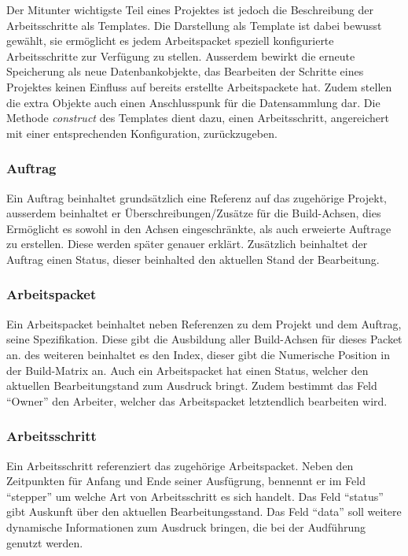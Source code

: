 Der Mitunter wichtigste Teil eines Projektes ist jedoch die Beschreibung der Arbeitsschritte als Templates.
Die Darstellung als Template ist dabei bewusst gew\"ahlt,
sie erm\"oglicht es jedem Arbeitspacket speziell konfigurierte Arbeitsschritte zur Verf\"ugung zu stellen.
Ausserdem bewirkt die erneute Speicherung als neue Datenbankobjekte,
das Bearbeiten der Schritte eines Projektes keinen Einfluss auf bereits erstellte Arbeitspackete hat.
Zudem stellen die extra Objekte auch einen Anschlusspunk f\"ur die Datensammlung dar.
Die Methode \textit{construct} des Templates dient dazu,
einen Arbeitsschritt, angereichert mit einer entsprechenden Konfiguration, zur\"uckzugeben.

\subsubsection{Auftrag}

Ein Auftrag beinhaltet grunds\"atzlich eine Referenz auf das zugeh\"orige Projekt,
ausserdem beinhaltet er \"Uberschreibungen/Zus\"atze f\"ur die Build-Achsen,
dies Erm\"oglicht es sowohl in den Achsen eingeschr\"ankte, als auch erweierte Auftrage zu erstellen.
Diese werden sp\"ater genauer erkl\"art.
Zus\"atzlich beinhaltet der Auftrag einen Status, dieser beinhalted den aktuellen Stand der Bearbeitung.

\subsubsection{Arbeitspacket}
Ein Arbeitspacket beinhaltet neben Referenzen zu dem Projekt und dem Auftrag,
seine Spezifikation. Diese gibt die Ausbildung aller Build-Achsen f\"ur dieses Packet an.
des weiteren beinhaltet es den Index, dieser gibt die Numerische Position in der Build-Matrix an.
Auch ein Arbeitspacket hat einen Status, welcher den aktuellen Bearbeitungstand zum Ausdruck bringt.
Zudem bestimmt das Feld ``Owner'' den Arbeiter, welcher das Arbeitspacket letztendlich bearbeiten wird.

\subsubsection{Arbeitsschritt}

Ein Arbeitsschritt referenziert das zugeh\"orige Arbeitspacket.
Neben den Zeitpunkten f\"ur Anfang und Ende seiner Ausf\"ugrung,
bennennt er im Feld ``stepper'' um welche Art von Arbeitsschritt es sich handelt.
Das Feld ``status'' gibt Auskunft \"uber den aktuellen Bearbeitungsstand.
Das Feld ``data'' soll weitere dynamische Informationen zum Ausdruck bringen,
die bei der Audf\"uhrung genutzt werden.

